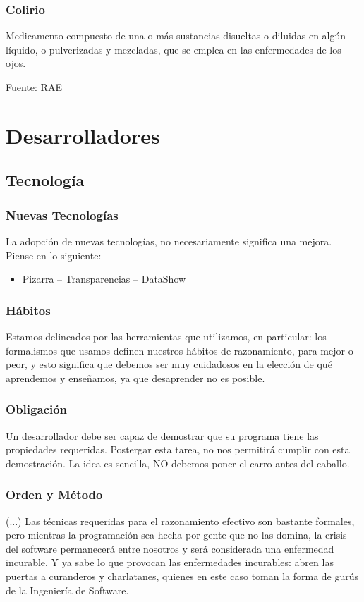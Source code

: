 \documentclass[12pt]{beamer}
\begin{document}
\begin{frame}
 \frametitle{Colirio}
 Medicamento compuesto de una o más sustancias disueltas o diluidas en algún líquido, o pulverizadas y mezcladas, que se emplea en las enfermedades de los ojos.
 
 \newline
 \newline
 \href{http://lema.rae.es/drae/?val=colirio}{Fuente: RAE}
\end{frame}

\section{Desarrolladores}
\subsection{Tecnología}

\begin{frame}
 \frametitle{Nuevas Tecnologías}
 La adopción de nuevas tecnologías, no necesariamente significa una mejora.
 \pause
 Piense en lo siguiente:
 \begin{itemize}
  \item Pizarra -- Transparencias -- DataShow
 \end{itemize}
\end{frame}


\begin{frame}
 \frametitle{Hábitos}
 Estamos delineados por las herramientas que utilizamos, en particular: los formalismos que usamos definen nuestros hábitos de razonamiento, para mejor o peor, y esto significa que debemos ser muy cuidadosos en la elección de qué aprendemos y enseñamos, ya que desaprender no es posible.
\end{frame}


\begin{frame}
 \frametitle{Obligación}
 Un desarrollador \alert{debe} ser capaz de demostrar que su programa tiene las propiedades \alert{requeridas}. Postergar esta tarea, no nos permitirá cumplir con esta demostración. 
 \newline 
 \pause
 La idea es sencilla, \alert{NO} debemos poner el carro antes del caballo.
\end{frame}


\begin{frame}
 \frametitle{Orden y Método}
 (...) Las técnicas requeridas para el razonamiento efectivo son bastante formales, pero mientras la programación sea hecha por gente que no las domina, la crisis del software permanecerá entre nosotros y será considerada una enfermedad incurable. Y ya sabe lo que provocan las enfermedades incurables: abren las puertas a curanderos y charlatanes, quienes en este caso toman la forma de gurús de la Ingeniería de Software. 
 \newline
\end{frame}
\end{document}
